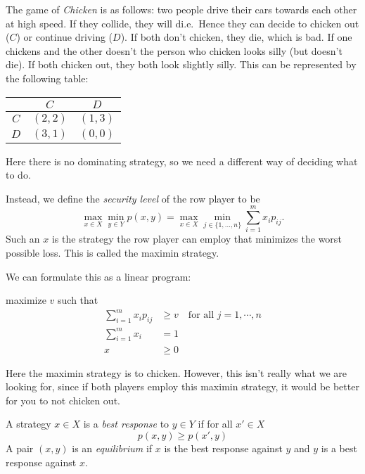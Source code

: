 \documentclass[a4paper]{article}
\begin{document}
\begin{eg}[Chicken]
  The game of \emph{Chicken} is as follows: two people drive their cars towards each other at high speed. If they collide, they will di.e.\ Hence they can decide to chicken out ($C$) or continue driving ($D$). If both don't chicken, they die, which is bad. If one chickens and the other doesn't the person who chicken looks silly (but doesn't die). If both chicken out, they both look slightly silly. This can be represented by the following table:
  \begin{center}
    \begin{tabular}{ccc}
      \toprule
      & $C$ & $D$ \\
      \midrule
      $C$ & $(2, 2)$ & $(1, 3)$ \\
      $D$ & $(3, 1)$ & $(0, 0)$\\
      \bottomrule
    \end{tabular}
  \end{center}
  Here there is no dominating strategy, so we need a different way of deciding what to do.

  Instead, we define the \emph{security level} of the row player to be
  \[
    \max_{x\in X}\min_{y\in Y} p(x, y) = \max_{x\in X}\min_{j\in \{1, \ldots, n\}} \sum_{i = 1}^m x_i p_{ij}.
  \]
  Such an $x$ is the strategy the row player can employ that minimizes the worst possible loss. This is called the maximin strategy.

  We can formulate this as a linear program:
  \begin{center}
    maximize $v$ such that
    \begin{align*}
      \sum_{i = 1}^m x_i p_{ij} &\geq v\quad\text{for all }j = 1, \cdots, n\\
      \sum_{i = 1}^m x_i &= 1\\
      x &\geq 0
    \end{align*}
  \end{center}
  Here the maximin strategy is to chicken. However, this isn't really what we are looking for, since if both players employ this maximin strategy, it would be better for you to not chicken out.
\end{eg}

\begin{defi}
  A strategy $x\in X$ is a \emph{best response} to $y\in Y$ if for all $x'\in X$
  \[
    p(x, y) \geq p(x', y)
  \]
  A pair $(x, y)$ is an \emph{equilibrium} if $x$ is the best response against $y$ and $y$ is a best response against $x$.
\end{defi}
\end{document}
